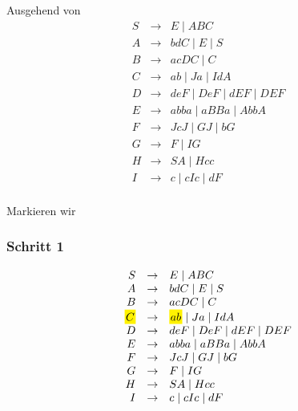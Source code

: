 \documentclass{article}
\begin{document}
\newcommand{\grule}[2]{#1 & \rightarrow & #2}
\begin{multicols}{2}

   Ausgehend von 
   \begin{equation*}
      \begin{array}{rcl}
         \grule{S}{E \mid ABC} \\
         \grule{A}{bdC \mid E \mid S} \\
         \grule{B}{acDC \mid C} \\
         \grule{C}{ab \mid Ja \mid IdA} \\
         \grule{D}{deF \mid DeF \mid dEF \mid DEF} \\
         \grule{E}{abba \mid aBBa \mid AbbA} \\
         \grule{F}{JcJ \mid GJ \mid bG} \\
         \grule{G}{F \mid IG} \\
         \grule{H}{SA \mid Hcc} \\
         \grule{I}{c \mid cIc \mid dF} \\
      \end{array}
   \end{equation*}


   Markieren wir

   \newcommand{\marked}[1]{\colorbox{yellow}{\hspace{-2pt}$#1$\hspace{-2pt}}}

   \subsubsection{Schritt 1}
   \begin{equation*}
      \begin{array}{rcl}
         \grule{S}{E \mid ABC} \\
         \grule{A}{bdC \mid E \mid S} \\
         \grule{B}{acDC \mid C} \\
         \grule{\marked{C}}{\marked{ab} \mid Ja \mid IdA} \\
         \grule{D}{deF \mid DeF \mid dEF \mid DEF} \\
         \grule{E}{abba \mid aBBa \mid AbbA} \\
         \grule{F}{JcJ \mid GJ \mid bG} \\
         \grule{G}{F \mid IG} \\
         \grule{H}{SA \mid Hcc} \\
         \grule{I}{c \mid cIc \mid dF} \\
      \end{array}
   \end{equation*}


\end{multicols}
\end{document}
